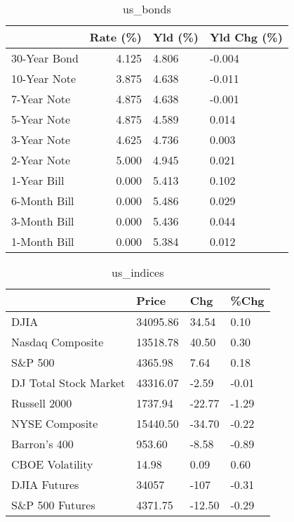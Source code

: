\documentclass{article}%
\begin{document}
%


\begin{table}[htbp]%
\caption{us\_bonds}%
\centering%
\begin{adjustbox}{width=1\textwidth}%
\begin{tabular}{lrll}
\toprule
             &  Rate (\%) & Yld (\%) & Yld Chg (\%) \\
\midrule
30-Year Bond &     4.125 &   4.806 &      -0.004 \\
10-Year Note &     3.875 &   4.638 &      -0.011 \\
 7-Year Note &     4.875 &   4.638 &      -0.001 \\
 5-Year Note &     4.875 &   4.589 &       0.014 \\
 3-Year Note &     4.625 &   4.736 &       0.003 \\
 2-Year Note &     5.000 &   4.945 &       0.021 \\
 1-Year Bill &     0.000 &   5.413 &       0.102 \\
6-Month Bill &     0.000 &   5.486 &       0.029 \\
3-Month Bill &     0.000 &   5.436 &       0.044 \\
1-Month Bill &     0.000 &   5.384 &       0.012 \\
\bottomrule
\end{tabular}
%
\end{adjustbox}%
\end{table}

%


\begin{table}[htbp]%
\caption{us\_indices}%
\centering%
\begin{adjustbox}{width=1\textwidth}%
\begin{tabular}{llll}
\toprule
                      &    Price &    Chg &  \%Chg \\
\midrule
                 DJIA & 34095.86 &  34.54 &  0.10 \\
     Nasdaq Composite & 13518.78 &  40.50 &  0.30 \\
              S\&P 500 &  4365.98 &   7.64 &  0.18 \\
DJ Total Stock Market & 43316.07 &  -2.59 & -0.01 \\
         Russell 2000 &  1737.94 & -22.77 & -1.29 \\
       NYSE Composite & 15440.50 & -34.70 & -0.22 \\
         Barron's 400 &   953.60 &  -8.58 & -0.89 \\
      CBOE Volatility &    14.98 &   0.09 &  0.60 \\
         DJIA Futures &    34057 &   -107 & -0.31 \\
      S\&P 500 Futures &  4371.75 & -12.50 & -0.29 \\
\bottomrule
\end{tabular}
%
\end{adjustbox}%
\end{table}
\end{document}
